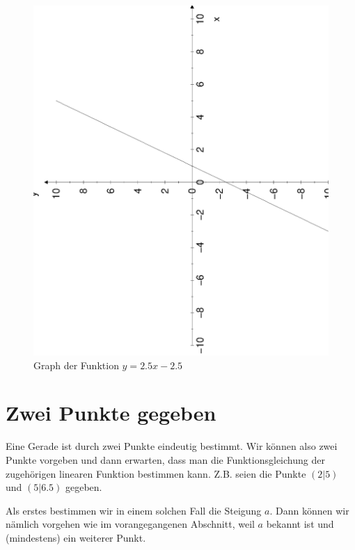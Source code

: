 \documentclass[%
11pt,%
twoside,%
titlepage,%
german,%
headsepline%
]{scrartcl}
\begin{document}
{\begin{figure}[b!]
  \centering
  \includegraphics[angle=-90,width=\linewidth]{pictures/a+pktgeg.eps}
  \caption{Graph der Funktion $y=2.5x-2.5$}
  \label{fig:linfkt2:a+pktgeg}
\end{figure}

\section{Zwei Punkte gegeben}
\label{linfkt2:2pktgeg}

Eine Gerade ist durch zwei Punkte eindeutig bestimmt. Wir k\"onnen also zwei Punkte vorgeben und dann erwarten, dass man die Funktionsgleichung der zugeh\"origen linearen Funktion bestimmen kann. Z.B. seien die Punkte $(2|5)$ und $(5|6.5)$ gegeben.

Als erstes bestimmen wir in einem solchen Fall die Steigung $a$. Dann k\"onnen wir n\"amlich vorgehen wie im vorangegangenen Abschnitt, weil $a$ bekannt ist und (mindestens) ein weiterer Punkt.

}
\end{document}
